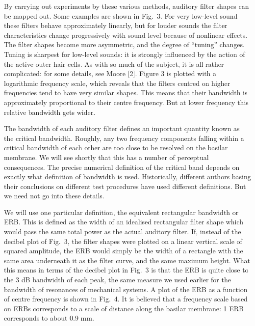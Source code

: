   By carrying out experiments by these various methods, auditory filter shapes 
  can be mapped out. Some examples are shown in Fig.\ 3. For very low-level 
  sound these filters behave approximately linearly, but for louder sounds the 
  filter characteristics change progressively with sound level because of 
  nonlinear effects. The filter shapes become more asymmetric, and the degree 
  of ``tuning'' changes. Tuning is sharpest for low-level sounds: it is 
  strongly influenced by the action of the active outer hair cells. As with so 
  much of the subject, it is all rather complicated: for some details, see 
  Moore [2]. Figure 3 is plotted with a logarithmic frequency scale, which 
  reveals that the filters centred on higher frequencies tend to have very 
  similar shapes. This means that their bandwidth is approximately proportional 
  to their centre frequency. But at lower frequency this relative bandwidth 
  gets wider. 

  The bandwidth of each auditory filter defines an important quantity known as 
  the critical bandwidth. Roughly, any two frequency components falling within 
  a critical bandwidth of each other are too close to be resolved on the 
  basilar membrane. We will see shortly that this has a number of perceptual 
  consequences. The precise numerical definition of the critical band depends 
  on exactly what definition of bandwidth is used. Historically, different 
  authors basing their conclusions on different test procedures have used 
  different definitions. But we need not go into these details. 

  We will use one particular definition, the equivalent rectangular bandwidth 
  or ERB. This is defined as the width of an idealised rectangular filter shape 
  which would pass the same total power as the actual auditory filter. If, 
  instead of the decibel plot of Fig.\ 3, the filter shapes were plotted on a 
  linear vertical scale of squared amplitude, the ERB would simply be the width 
  of a rectangle with the same area underneath it as the filter curve, and the 
  same maximum height. What this means in terms of the decibel plot in Fig.\ 3 
  is that the ERB is quite close to the 3 dB bandwidth of each peak, the same 
  measure we used earlier for the bandwidth of resonances of mechanical 
  systems. A plot of the ERB as a function of centre frequency is shown in 
  Fig.\ 4. It is believed that a frequency scale based on ERBs corresponds to a 
  scale of distance along the basilar membrane: 1 ERB corresponds to about 0.9 
  mm. 

